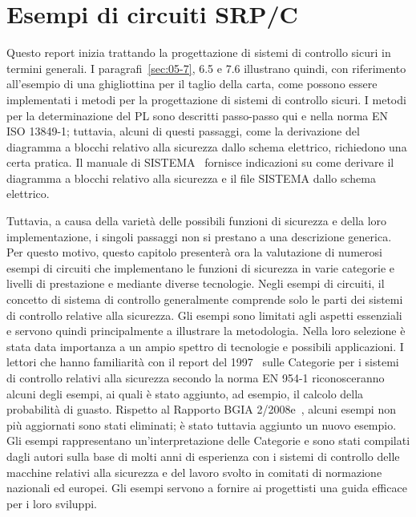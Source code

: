 \chapter{Esempi di circuiti SRP/C}
\label{cap:08}
Questo report inizia trattando la progettazione di sistemi di controllo sicuri in termini generali. I paragrafi~\ref{sec:05-7}, 6.5 e 7.6 illustrano quindi, con riferimento all'esempio di una ghigliottina per il taglio della carta, come possono essere implementati i metodi per la progettazione di sistemi di controllo sicuri. I metodi per la determinazione del PL sono descritti passo-passo qui e nella norma EN ISO 13849-1; tuttavia, alcuni di questi passaggi, come la derivazione del diagramma a blocchi relativo alla sicurezza dallo schema elettrico, richiedono una certa pratica. Il manuale di SISTEMA~\cite{cookbook1} fornisce indicazioni su come derivare il diagramma a blocchi relativo alla sicurezza e il file SISTEMA dallo schema elettrico.

Tuttavia, a causa della varietà delle possibili funzioni di sicurezza e della loro implementazione, i singoli passaggi non si prestano a una descrizione generica. Per questo motivo, questo capitolo presenterà ora la valutazione di numerosi esempi di circuiti che implementano le funzioni di sicurezza in varie categorie e livelli di prestazione e mediante diverse tecnologie. Negli esempi di circuiti, il concetto di sistema di controllo generalmente comprende solo le parti dei sistemi di controllo relative alla sicurezza. Gli esempi sono limitati agli aspetti essenziali e servono quindi principalmente a illustrare la metodologia. Nella loro selezione è stata data importanza a un ampio spettro di tecnologie e possibili applicazioni. I lettori che hanno familiarità con il report del 1997~\cite{en954-1} sulle Categorie per i sistemi di controllo relativi alla sicurezza secondo la norma EN 954-1 riconosceranno alcuni degli esempi, ai quali è stato aggiunto, ad esempio, il calcolo della probabilità di guasto. Rispetto al Rapporto BGIA 2/2008e~\cite{bgiareport2-2008}, alcuni esempi non più aggiornati sono stati eliminati; è stato tuttavia aggiunto un nuovo esempio. Gli esempi rappresentano un'interpretazione delle Categorie e sono stati compilati dagli autori sulla base di molti anni di esperienza con i sistemi di controllo delle macchine relativi alla sicurezza e del lavoro svolto in comitati di normazione nazionali ed europei. Gli esempi servono a fornire ai progettisti una guida efficace per i loro sviluppi.

